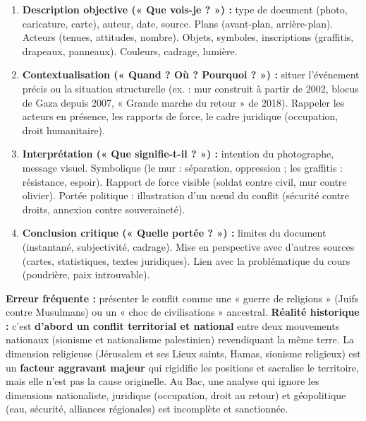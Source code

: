 \documentclass[11pt]{article}
\begin{document}
\begin{methode}
\begin{enumerate}
    \item \textbf{Description objective (« Que vois-je ? ») :} type de document (photo, caricature, carte), auteur, date, source. Plans (avant-plan, arrière-plan). Acteurs (tenues, attitudes, nombre). Objets, symboles, inscriptions (graffitis, drapeaux, panneaux). Couleurs, cadrage, lumière.
    \item \textbf{Contextualisation (« Quand ? Où ? Pourquoi ? ») :} situer l'événement précis ou la situation structurelle (ex. : mur construit à partir de 2002, blocus de Gaza depuis 2007, « Grande marche du retour » de 2018). Rappeler les acteurs en présence, les rapports de force, le cadre juridique (occupation, droit humanitaire).
    \item \textbf{Interprétation (« Que signifie-t-il ? ») :} intention du photographe, message visuel. Symbolique (le mur : séparation, oppression ; les graffitis : résistance, espoir). Rapport de force visible (soldat contre civil, mur contre olivier). Portée politique : illustration d'un nœud du conflit (sécurité contre droits, annexion contre souveraineté).
    \item \textbf{Conclusion critique (« Quelle portée ? ») :} limites du document (instantané, subjectivité, cadrage). Mise en perspective avec d'autres sources (cartes, statistiques, textes juridiques). Lien avec la problématique du cours (poudrière, paix introuvable).
\end{enumerate}
\end{methode}

\begin{attention}
\textbf{Erreur fréquente :} présenter le conflit comme une « guerre de religions » (Juifs contre Musulmans) ou un « choc de civilisations » ancestral.
\textbf{Réalité historique :} c'est \textbf{d'abord un conflit territorial et national} entre deux mouvements nationaux (sionisme et nationalisme palestinien) revendiquant la même terre. La dimension religieuse (Jérusalem et ses Lieux saints, Hamas, sionisme religieux) est un \textbf{facteur aggravant majeur} qui rigidifie les positions et sacralise le territoire, mais elle n'est pas la cause originelle. Au Bac, une analyse qui ignore les dimensions nationaliste, juridique (occupation, droit au retour) et géopolitique (eau, sécurité, alliances régionales) est incomplète et sanctionnée.
\end{attention}
\end{document}
